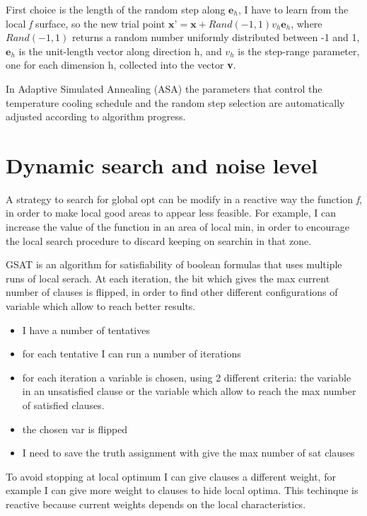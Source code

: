 \documentclass[10pt]{article}
\begin{document}
First choice is the length of the random step along $ \textbf{e}_h $, I  have to learn from the local \textit{f} surface, so the new trial point $ \textbf{x'} = \textbf{x} + Rand(-1,1)v_h \textbf{e}_h $, where $ Rand(-1, 1) $ returns a random number uniformly distributed between -1 and 1,  $ \textbf{e}_h $ is the unit-length vector along direction h, and $ v_h $ is the step-range parameter, one for each dimension h, collected into the vector \textbf{v}.

In Adaptive Simulated Annealing (ASA) the parameters that control the temperature cooling schedule and the random step selection are automatically adjusted according to algorithm progress.

\section{Dynamic search and noise level}
A strategy to search for global opt can be modify in a reactive way the function \textit{f}, in order to make local good areas to appear less feasible. For example, I can increase the value of the function in an area of local min, in order to encourage the local search procedure to discard keeping on searchin in that zone. 

GSAT is an algorithm for satisfiability of boolean formulas that uses multiple runs of local serach. At each iteration, the bit which gives the max current number of clauses is flipped, in order to find other different configurations of variable which allow to reach better results. 

\begin{itemize}
\item I have a number of tentatives
\item for each tentative I can run a number of iterations
\item for each iteration a variable is chosen, using 2 different criteria: the variable in an unsatisfied clause or the variable which allow to reach the max number of satisfied clauses. 
\item the chosen var is flipped
\item I need to save the truth assignment with give the max number of sat clauses
\end{itemize}

To avoid stopping at local optimum I can give clauses a different weight, for example I can give more weight to clauses to hide local optima. This techinque is reactive because current weights depends on the local characteristics. 
\end{document}
